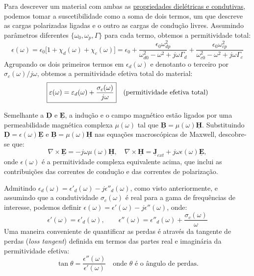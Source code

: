 Para descrever um material com ambas as \underline{propriedades dielétricas e condutivas}, podemos tomar a suscetibilidade como a soma de dois termos, um que descreve as cargas polarizadas ligadas e o outro as cargas de condução livres. Assumindo parâmetros diferentes $\{ \omega_0, \omega_p, \Gamma \}$ para cada termo, obtemos a permitividade total:
$$
    \epsilon(\omega) 
    =
    \epsilon_0 \Big[ 1 + \chi_d(\omega) + \chi_c(\omega) \Big]
    =
    \epsilon_0 
    + 
    \frac{\epsilon_0 \omega_{dp}^2}{\omega_{d0}^2 - \omega^2 + j\omega \Gamma_d} 
    + 
    \frac{\epsilon_0 \omega_{cp}^2}{\omega_{c0}^2 - \omega^2 + j\omega \Gamma_c}
$$
Agrupando os dois primeiros termos em $\epsilon_d(\omega)$ e denotanto o terceiro por $\sigma_c(\omega)/j\omega$, obtemos a permitividade efetiva total do material:
$$
    \boxed{%
        \epsilon(\omega) = \epsilon_d(\omega) + \frac{\sigma_c(\omega)}{j\omega}
    }
    \quad \text{(permitividade efetiva total)}
$$

\begin{check}
    Semelhante a $\mathbf{\underline{D}}$ e $\mathbf{\underline{E}}$, a indução e o campo magnético estão ligados por uma permeabilidade magnética complexa $\mu(\omega)$ tal que $\mathbf{\underline{B}} = \mu(\omega)\mathbf{\underline{H}}$. Substituindo $\mathbf{\underline{D}} = \epsilon(\omega)\mathbf{\underline{E}}$ e $\mathbf{\underline{B}} = \mu(\omega)\mathbf{\underline{H}}$ nas equações macroscópicas de Maxwell, descobre-se que:
    $$
        \nabla \times \mathbf{\underline{E}} = -j\omega\mu(\omega)\mathbf{\underline{H}},
        \quad
        \nabla \times \mathbf{\underline{H}} = \mathbf{\underline{J}}_{ext} + j\omega\epsilon(\omega)\mathbf{\underline{E}}, 
    $$
    onde $\epsilon (\omega)$ é a permitividade complexa equivalente acima, que inclui as contribuições das correntes de condução e das correntes de polarização.
\end{check}

Admitindo $\epsilon_d(\omega) = \epsilon'_d(\omega) - j\epsilon''_d(\omega)$, como visto anteriormente, e assumindo que a condutividade $\sigma_c(\omega)$ é real para a gama de frequências de interesse, podemos definir $\epsilon(\omega) = \epsilon'(\omega) - j\epsilon''(\omega)$, onde:
$$
    \epsilon'(\omega) = \epsilon'_d(\omega), \qquad \epsilon''(\omega) = \epsilon''_d(\omega) + \frac{\sigma_c(\omega)}{\omega}
$$
Uma maneira conveniente de quantificar as perdas é através da tangente de perdas (\textit{loss tangent}) definida em termos das partes real e imaginária da permitividade efetiva:
$$
    \boxed{ \tan \theta = \frac{\epsilon''(\omega)}{\epsilon'(\omega)} } \quad \text{onde $\theta$ é o ângulo de perdas.}
$$
